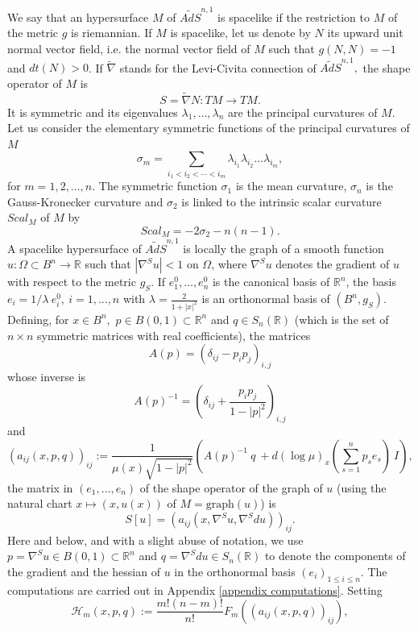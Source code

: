 \documentclass[10pt,reqno,oneside]{amsart}
\theoremstyle{definition}
\theoremstyle{remark}
\newcommand{\R}{\mathbb{R}}
\begin{document}
We say that an hypersurface $M$ of $\widetilde{AdS}^{n,1}$ is spacelike if the restriction to $M$ of the metric $g$ is riemannian. If $M$ is spacelike, let us denote by $N$ its upward unit normal vector field, i.e. the normal vector field of $M$ such that $g(N,N)=-1$ and $dt(N)>0$. If $\widetilde{\nabla}$ stands for the Levi-Civita connection of $\widetilde{AdS}^{n,1},$ the shape operator of $M$ is
$$S=\widetilde{\nabla}N:TM\rightarrow TM.$$
It is symmetric and its eigenvalues $\lambda_1,\ldots,\lambda_n$ are the principal curvatures of $M$. Let us consider the elementary symmetric functions of the principal curvatures of $M$
$$\sigma_m=\sum_{i_1<i_2<\cdots <i_m}\lambda_{i_1}\lambda_{i_2}\ldots\lambda_{i_m},$$
for $m=1,2,\ldots,n.$ The symmetric function $\sigma_1$ is the mean curvature, $\sigma_n$ is the Gauss-Kronecker curvature and $\sigma_2$ is linked to the intrinsic scalar curvature $Scal_M$ of $M$ by
$$Scal_M=-2\sigma_2-n(n-1).$$
A spacelike hypersurface of $\widetilde{AdS}^{n,1}$ is locally the graph of a smooth function $u:\Omega\subset B^n\rightarrow\R$ such that $|\nabla^Su|<1$ on $\Omega$, where $\nabla^Su$ denotes the gradient of $u$ with respect to the metric $g_S.$ If $e_1^0,\ldots, e_n^0$ is the canonical basis of $\R^n$, the basis $e_i=1/\lambda\ e_i^0,\ i=1,\ldots,n$ with $\lambda=\frac{2}{1+|x|^2}$ is an orthonormal basis of $(B^n,g_S).$ Defining, for $x\in B^n,$ $p\in B(0,1)\subset\R^n$ and $q\in S_n(\R)$ (which is the set of $n\times n$ symmetric matrices with real coefficients), the matrices
$$A(p)=\left(\delta_{ij}-p_ip_j\right)_{i,j}$$
whose inverse is
$$A(p)^{-1}=\left(\delta_{ij}+\frac{p_ip_j}{1-|p|^2}\right)_{i,j}$$
and
\begin{equation}\label{intro def aij xpq}
(a_{ij}(x,p,q))_{ij}:=\frac{1}{\mu(x)\sqrt{1-|p|^2}}\left(A(p)^{-1}\ q\ +d(\log\mu)_x\left(\sum_{s=1}^np_s e_s\right)\ I\right),
\end{equation}
the matrix in $(e_1,\ldots,e_n)$ of the shape operator of the graph of $u$ (using the natural chart $x\mapsto (x,u(x))$ of $M=\mbox{graph}(u)$) is
\begin{equation}\label{intro def Su}
S[u]=\left(a_{ij}(x,\nabla^Su,\nabla^Sdu)\right)_{ij}.
\end{equation}
Here and below, and with a slight abuse of notation, we use $p=\nabla^S u\in B(0,1)\subset\R^n$ and $q=\nabla^Sd u\in S_n(\R)$ to denote the components of the gradient and the hessian of $u$ in the orthonormal basis $(e_i)_{1\leq i\leq n}.$ The computations are carried out in Appendix \ref{appendix computations}. Setting
\begin{equation}\label{def Hmxpq intro}
\mathcal{H}_m(x,p,q):=\frac{m!(n-m)!}{n!}F_m((a_{ij}(x,p,q))_{ij}),
\end{equation}
\end{document}

